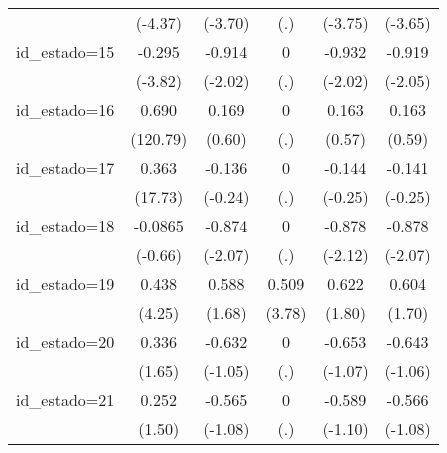 {\begin{tabular}{l*{5}{c}}
                    &     (-4.37)         &     (-3.70)         &         (.)         &     (-3.75)         &     (-3.65)         \\
[1em]
id\_estado=15        &      -0.295\sym{***}&      -0.914\sym{*}  &           0         &      -0.932\sym{*}  &      -0.919\sym{*}  \\
                    &     (-3.82)         &     (-2.02)         &         (.)         &     (-2.02)         &     (-2.05)         \\
[1em]
id\_estado=16        &       0.690\sym{***}&       0.169         &           0         &       0.163         &       0.163         \\
                    &    (120.79)         &      (0.60)         &         (.)         &      (0.57)         &      (0.59)         \\
[1em]
id\_estado=17        &       0.363\sym{***}&      -0.136         &           0         &      -0.144         &      -0.141         \\
                    &     (17.73)         &     (-0.24)         &         (.)         &     (-0.25)         &     (-0.25)         \\
[1em]
id\_estado=18        &     -0.0865         &      -0.874\sym{*}  &           0         &      -0.878\sym{*}  &      -0.878\sym{*}  \\
                    &     (-0.66)         &     (-2.07)         &         (.)         &     (-2.12)         &     (-2.07)         \\
[1em]
id\_estado=19        &       0.438\sym{***}&       0.588         &       0.509\sym{***}&       0.622         &       0.604         \\
                    &      (4.25)         &      (1.68)         &      (3.78)         &      (1.80)         &      (1.70)         \\
[1em]
id\_estado=20        &       0.336         &      -0.632         &           0         &      -0.653         &      -0.643         \\
                    &      (1.65)         &     (-1.05)         &         (.)         &     (-1.07)         &     (-1.06)         \\
[1em]
id\_estado=21        &       0.252         &      -0.565         &           0         &      -0.589         &      -0.566         \\
                    &      (1.50)         &     (-1.08)         &         (.)         &     (-1.10)         &     (-1.08)         \\

\end{tabular}}
